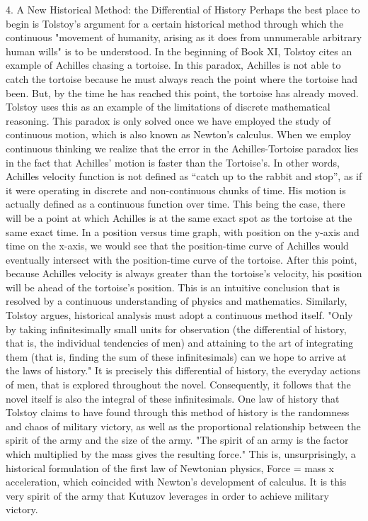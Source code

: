 4. A New Historical Method: the Differential of History
Perhaps the best place to begin is Tolstoy's argument for a certain historical method through which the continuous "movement of humanity, arising as it does from unnumerable arbitrary human wills" is to be understood. In the beginning of Book XI, Tolstoy cites an example of Achilles chasing a tortoise. In this paradox, Achilles is not able to catch the tortoise because he must always reach the point where the tortoise had been. But, by the time he has reached this point, the tortoise has already moved.  Tolstoy uses this as an example of the limitations of discrete mathematical reasoning.  This paradox is only solved once we have employed the study of continuous motion, which is also known as Newton's calculus.  
When we employ continuous thinking we realize that the error in the Achilles-Tortoise paradox lies in the fact that Achilles’ motion is faster than the Tortoise’s. In other words, Achilles velocity function is not defined as “catch up to the rabbit and stop”, as if it were operating in discrete and non-continuous chunks of time. His motion is actually defined as a continuous function over time. This being the case, there will be a point at which Achilles is at the same exact spot as the tortoise at the same exact time. In a position versus time graph, with position on the y-axis and time on the x-axis, we would see that the position-time curve of Achilles would eventually intersect with the position-time curve of the tortoise. After this point, because Achilles velocity is always greater than the tortoise’s velocity, his position will be ahead of the tortoise’s position. This is an intuitive conclusion that is resolved by a continuous understanding of physics and mathematics.
Similarly, Tolstoy argues, historical analysis must adopt a continuous method itself.  "Only by taking infinitesimally small units for observation (the differential of history, that is, the individual tendencies of men) and attaining to the art of integrating them (that is, finding the sum of these infinitesimals) can we hope to arrive at the laws of history." It is precisely this differential of history, the everyday actions of men, that is explored throughout the novel.  Consequently, it follows that the novel itself is also the integral of these infinitesimals. One law of history that Tolstoy claims to have found through this method of history is the randomness and chaos of military victory, as well as the proportional relationship between the spirit of the army and the size of the army.  "The spirit of an army is the factor which multiplied by the mass gives the resulting force."  This is, unsurprisingly, a historical formulation of the first law of Newtonian physics, Force = mass x acceleration, which coincided with Newton’s development of calculus.  It is this very spirit of the army that Kutuzov leverages in order to achieve military victory.
